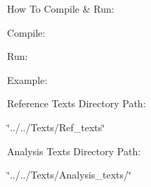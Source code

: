 How To Compile \& Run\+:

Compile\+: 
\begin{DoxyCode}{0}
\end{DoxyCode}


Run\+: 
\begin{DoxyCode}{0}
\end{DoxyCode}



\begin{DoxyItemize}
\item Example\+: 
\begin{DoxyCode}{0}
\end{DoxyCode}

\end{DoxyItemize}

Reference Texts Directory Path\+:


\begin{DoxyItemize}
\item \char`\"{}../../\+Texts/\+Ref\+\_\+texts\char`\"{}
\end{DoxyItemize}

Analysis Texts Directory Path\+:


\begin{DoxyItemize}
\item \char`\"{}../../\+Texts/\+Analysis\+\_\+texts/\char`\"{} 
\end{DoxyItemize}